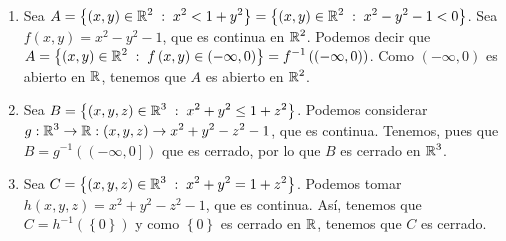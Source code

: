 \begin{eg}
\begin{enumerate}
	\item Sea $\displaystyle A = \left\{ \left(x,y\right) \in \mathbb{R}^{2} \; : \; x^{2} < 1 + y^{2}\right\} = \left\{ \left(x,y\right) \in \mathbb{R}^{2} \; : \; x^{2} - y^{2} - 1 < 0\right\}  $. Sea $\displaystyle f\left(x,y\right) = x^{2} - y^{2} -1 $, que es continua en $\displaystyle \mathbb{R}^{2} $. Podemos decir que $\displaystyle A = \left\{ \left(x,y\right)\in \mathbb{R}^{2} \; : \; f\left(x,y\right) \in \left(-\infty, 0\right)\right\} = f^{-1}\left(\left(-\infty,0\right)\right) $. Como $\displaystyle \left(-\infty,0\right) $ es abierto en $\displaystyle \mathbb{R} $, tenemos que $\displaystyle A $ es abierto en $\displaystyle \mathbb{R}^{2} $.
	\item Sea $\displaystyle B = \left\{ \left(x,y,z\right) \in \mathbb{R}^{3} \; : \; x^{2} +y ^{2} \leq 1 + z^{2}\right\}  $. Podemos considerar $\displaystyle g : \mathbb{R}^{3} \to \mathbb{R} : \left(x,y,z\right) \to x^{2} + y^{2}-z^{2} -1 $, que es continua. Tenemos, pues que $\displaystyle B = g^{-1}\left(\left(-\infty,0\right]\right) $ que es cerrado, por lo que $\displaystyle B $ es cerrado en $\displaystyle \mathbb{R}^{3} $.
	\item Sea $\displaystyle C = \left\{ \left(x,y,z\right) \in \mathbb{R}^{3} \; : \; x^{2} + y^{2} = 1 + z^{2}\right\}  $. Podemos tomar $\displaystyle h\left(x,y,z\right) = x^{2} +y^{2} -z^{2} -1 $, que es continua. Así, tenemos que $\displaystyle C = h^{-1}\left( \left\{ 0\right\} \right) $ y como $\displaystyle \left\{ 0\right\}  $ es cerrado en $\displaystyle \mathbb{R} $, tenemos que $\displaystyle C $ es cerrado. 
\end{enumerate}
\end{eg}
